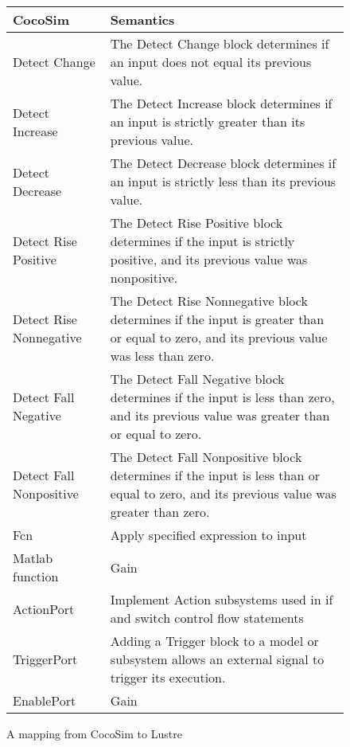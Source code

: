 \documentclass{llncs}
\begin{document}
\begin{figure}[t]
\centering
{
\begin{tabular}{lp{6cm}}
\hline
\textbf{CocoSim} & \textbf{Semantics}  \\
\hline

Detect Change &
The Detect Change block determines if an input does not equal its previous value.
\\

Detect Increase &
The Detect Increase block determines if an input is strictly greater than its previous value.
\\

Detect Decrease &
The Detect Decrease block determines if an input is strictly less than its previous value.
\\

Detect Rise Positive &
The Detect Rise Positive block determines if the input is strictly positive, and its previous value was nonpositive.
\\

Detect Rise Nonnegative &
The Detect Rise Nonnegative block determines if the input is greater than or equal to zero, and its previous value was less than zero.
\\

Detect Fall Negative &
The Detect Fall Negative block determines if the input is less than zero, and its previous value was greater than or equal to zero.
\\

Detect Fall Nonpositive &
The Detect Fall Nonpositive block determines if the input is less than or equal to zero, and its previous value was greater than zero.
\\


Fcn &
Apply specified expression to input
\\

Matlab function &
Gain
\\

ActionPort &
Implement Action subsystems used in if and switch control flow statements
\\

TriggerPort &
Adding a Trigger block to a model or subsystem allows an external signal to trigger its execution.
\\

EnablePort &
Gain
\\

\hline
\end{tabular}
}
\caption{A mapping from CocoSim to Lustre}
\label{mapping}
\end{figure}
\end{document}
